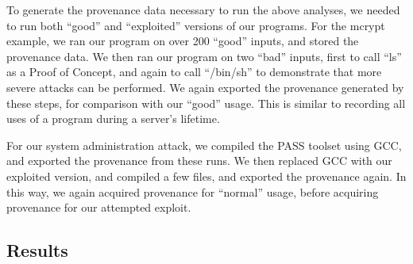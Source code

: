 \documentclass[10pt,twocolumn]{article}
\begin{document}
To generate the provenance data necessary to run the above analyses, we needed to run both “good” and “exploited” versions of our programs. For the mcrypt example, we ran our program on over 200 “good” inputs, and stored the provenance data. We then ran our program on two “bad” inputs, first to call “ls” as a Proof of Concept, and again to call “/bin/sh” to demonstrate that more severe attacks can be performed. We again exported the provenance generated by these steps, for comparison with our “good” usage. This is similar to recording all uses of a program during a server’s lifetime. 

For our system administration attack, we compiled the PASS toolset using GCC, and exported the provenance from these runs. We then replaced GCC with our exploited version, and compiled a few files, and exported the provenance again. In this way, we again acquired provenance for “normal” usage, before acquiring provenance for our attempted exploit. 


\subsection{Results}
\end{document}
